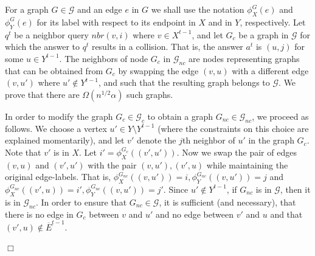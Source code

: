 \documentclass{article}
\newcommand{\calD}{{\mathcal{D}}}
\newcommand{\calG}{{\mathcal{G}}}
\newenvironment{proof}{\smallskip\noindent{\bf Proof:}}%
        {\hspace*{\fill}$\Box$\par}
\newcommand{\commentt}[1]{ {}}
\begin{document}
\begin{proof}

For a graph $G\in \calG$ and an edge $e$ in $G$ we shall use the notation $\phi^{G}_X(e)$
and $\phi^G_Y(e)$ for its label with respect to its endpoint in $X$ and in $Y$, respectively.
Let $q^t$ be a neighbor query $nbr(v,i)$ where %
$v\in X^{t-1}$, 
and let $G_{c}$ be a graph in $\calG$ for which the answer to $q^t$ results in a collision. That is,  the answer $a^t$ is $(u,j)$ for some $u\in Y^{t-1}$.
The neighbors of node $G_{c}$ in $\calG_{nc}$ are nodes representing graphs that can be obtained from $G_{c}$ by swapping the edge $(v,u)$ with a different edge $(v, u')$ where $u'\notin Y^{t-1}$, and  %
such that the resulting graph belongs to $\calG$.
We prove that there are $\Omega(n^{1/2}\alpha)$ such graphs.

In order to modify the graph $G_c \in \calG_c$ to obtain a graph $G_{nc} \in \calG_{nc}$, we proceed as follows.
    We choose a vertex %
    $u'\in Y\setminus Y^{t-1}$ (where the constraints on this choice are explained momentarily), and let $v'$ denote the $j$th neighbor of $u'$ in the graph $G_{c}$. Note that $v'$ is in $X$. Let $i'=\phi^{G_c}_X((v',u'))$. Now we swap the pair of  edges $(v,u)$
    and $(v',u')$   with the pair  $(v,u'), (v',u)$  while maintaining the original edge-labels. That is, $\phi^{G_{nc}}_X((v,u'))=i, \phi^{G_{nc}}_Y((v,u'))=j$ and $\phi^{G_{nc}}_X((v',u))=i', \phi^{G_{nc}}_Y((v,u'))=j'$.
    Since $u' \notin Y^{t-1}$, if $G_{nc}$ is in $\calG$, then it is in $\calG_{nc}$. In order to ensure that $G_{nc}\in\calG$, it is sufficient (and necessary), that there is no edge in $G_c$ between $v$ and $u'$ and no edge between $v'$ and $u$ and that
    $(v',u)\notin \overline{E}^{t-1}$.

\end{proof}
\end{document}
